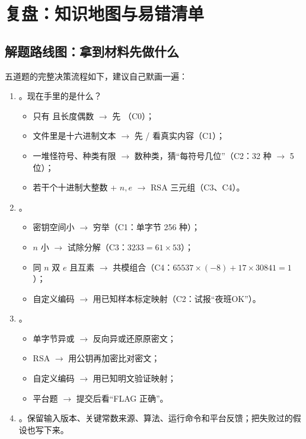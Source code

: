 \documentclass[UTF8,12pt,oneside]{ctexbook}
\begin{document}


\chapter{复盘：知识地图与易错清单}

\section{解题路线图：拿到材料先做什么}
五道题的完整决策流程如下，建议自己默画一遍：
\begin{enumerate}
\item {}。现在手里的是什么？
\begin{itemize}
\item 只有  且长度偶数 $\rightarrow$ 先 （C0）；
\item 文件里是十六进制文本 $\rightarrow$ 先  /  看真实内容（C1）；
\item 一堆怪符号、种类有限 $\rightarrow$ 数种类，猜“每符号几位”（C2：32 种 $\rightarrow$ 5 位）；
\item 若干个十进制大整数 + $n, e$ $\rightarrow$ RSA 三元组（C3、C4）。
\end{itemize}
\item {}。
\begin{itemize}
\item 密钥空间小 $\rightarrow$ 穷举（C1：单字节 256 种）；
\item $n$ 小 $\rightarrow$ 试除分解（C3：$3233 = 61 \times 53$）；
\item 同 $n$ 双 $e$ 且互素 $\rightarrow$ 共模组合（C4：$65537 \times (-8) + 17 \times 30841 = 1$）；
\item 自定义编码 $\rightarrow$ 用已知样本标定映射（C2：试报“夜班OK”）。
\end{itemize}
\item {}。
\begin{itemize}
\item 单字节异或 $\rightarrow$ 反向异或还原原密文；
\item RSA $\rightarrow$ 用公钥再加密比对密文；
\item 自定义编码 $\rightarrow$ 用已知明文验证映射；
\item 平台题 $\rightarrow$ 提交后看“FLAG 正确”。
\end{itemize}
\item {}。保留输入版本、关键常数来源、算法、运行命令和平台反馈；把失败过的假设也写下来。
\end{enumerate}
\end{document}
